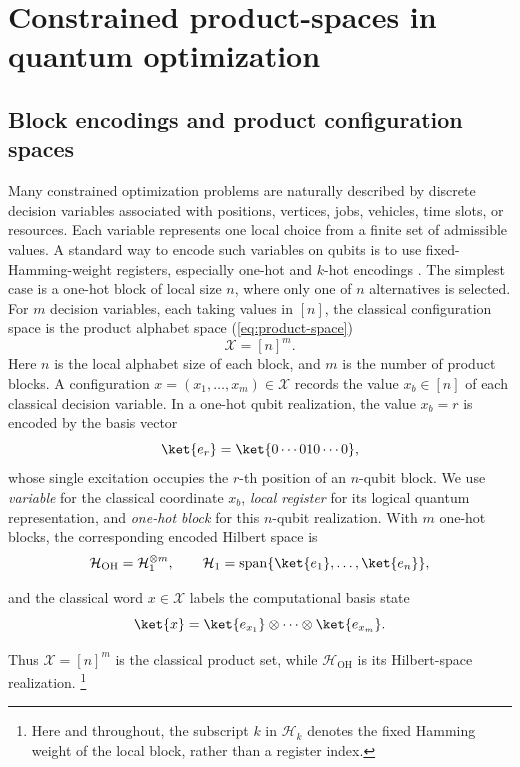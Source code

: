 \documentclass[a4paper,onecolumn,11pt,unpublished]{quantumarticle}
\theoremstyle{remark}
\begin{document}
\section{Constrained product-spaces in quantum optimization}
\label{subsec:subspace-constrained-dynamics}

\subsection{Block encodings and product configuration spaces}
\label{subsec:block-encodings-product spaces}

Many constrained optimization problems are naturally described by discrete decision variables associated with positions, vertices, jobs, vehicles, time slots, or resources. Each variable represents one local choice from a finite set of admissible values. A standard way to encode such variables on qubits is to use fixed-Hamming-weight registers, especially one-hot and \(k\)-hot encodings \cite{Hadfield2019AOA,Fuchs2022ConstrainedMixers, sawaya2023encoding,tsvelikhovskiy2024symmetries,onahce}. The
simplest case is a one-hot block of local size \(n\),
where only one of \(n\) alternatives is selected. For \(m\) decision variables, each taking values in \([n]\), the classical configuration space is the product alphabet space (\cref{eq:product-space}) 
\[
\mathcal X=[n]^m .
\]
Here \(n\) is the local alphabet size of each block, and \(m\) is the number of
product blocks. A configuration \(x=(x_1,\dots,x_m)\in \mathcal X\) records the value \(x_b\in[n]\) of each classical decision variable. In a one-hot qubit realization, the value \(x_b=r\) is encoded by the basis vector \[ \ket{e_r} = \ket{0\cdots 010\cdots 0}, \] whose single excitation occupies the \(r\)-th position of an \(n\)-qubit block. We use \emph{variable} for the classical coordinate \(x_b\), \emph{local register} for its logical quantum representation, and \emph{one-hot block} for this \(n\)-qubit realization. With \(m\) one-hot blocks, the corresponding encoded Hilbert space is \[ 
\mathcal H_{\mathrm{OH}} = \mathcal H_1^{\otimes m}, \qquad \mathcal H_1 = \operatorname{span}\{\ket{e_1},\dots,\ket{e_n}\}, 
\] 

and the classical word \(x\in \mathcal X\) labels the computational basis state 
\[ 
\ket{x} = \ket{e_{x_1}}\otimes\cdots\otimes\ket{e_{x_m}}. 
\] 

Thus \(\mathcal X=[n]^m\) is the classical product set, while \(\mathcal H_{\mathrm{OH}}\) is its Hilbert-space realization. \footnote{Here and throughout, the subscript \(k\) in
\(\mathcal H_k\) denotes the fixed Hamming weight of the local block, rather
than a register index.} 
\end{document}
